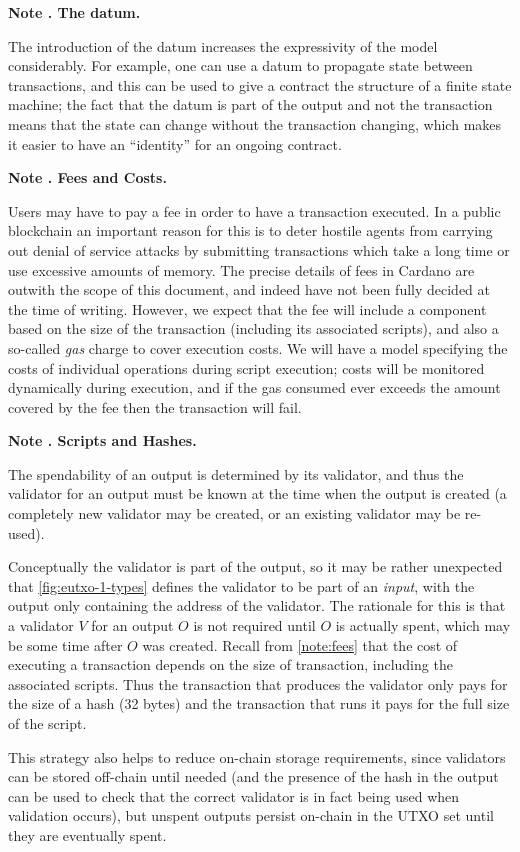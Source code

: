\documentclass[a4paper]{article}
\newcounter{note}
\newcommand{\note}[1]{
  \bigskip
  \refstepcounter{note}
  \noindent\textbf{Note \thenote. #1}
}
\begin{document}
\note{The datum.}
\label{note:datum}
The introduction of the datum
increases the expressivity of the model considerably. For example,
one can use a datum to propagate state between
transactions, and this can be used to give a contract the structure
of a finite state machine; the fact that the datum is part
of the output and not the transaction means that the state can
change without the transaction changing, which makes it easier to
have an ``identity'' for an ongoing contract.

\note{Fees and Costs.}
\label{note:fees}
Users may have to pay a fee in order to have a transaction executed.
In a public blockchain an important reason for this is to deter
hostile agents from carrying out denial of service attacks by
submitting transactions which take a long time or use excessive
amounts of memory.  The precise details of fees in Cardano are outwith
the scope of this document, and indeed have not been fully decided at
the time of writing. However, we expect that the fee will include a
component based on the size of the transaction (including its
associated scripts), and also a so-called \textit{gas} charge to cover
execution costs.  We will have a model specifying the costs of
individual operations during script execution; costs will be monitored
dynamically during execution, and if the gas consumed ever exceeds the
amount covered by the fee then the transaction will fail.

\note{Scripts and Hashes.}
\label{note:scripts} The spendability of an output is determined by
its validator, and thus the validator for an output must be
known at the time when the output is created (a completely new validator
may be created, or an existing validator may be re-used).

Conceptually the validator is part of the output, so it may be rather
unexpected that \cref{fig:eutxo-1-types} defines the validator
to be part of an \textit{input}, with the output only containing the
address of the validator.  The rationale for this is that a validator
$V$ for an output $O$ is not required until $O$ is actually spent,
which may be some time after $O$ was created. Recall from
\cref{note:fees} that the cost of executing a transaction depends
on the size of transaction, including the associated scripts.  Thus
the transaction that produces the validator only pays for the size of
a hash (32 bytes) and the transaction that runs it pays for the full
size of the script.

This strategy also helps to reduce on-chain
storage requirements, since validators can be stored off-chain until
needed (and the presence of the hash in the output can be used to
check that the correct validator is in fact being used when validation
occurs), but unspent outputs persist on-chain in the UTXO set until
they are eventually spent.
\end{document}
